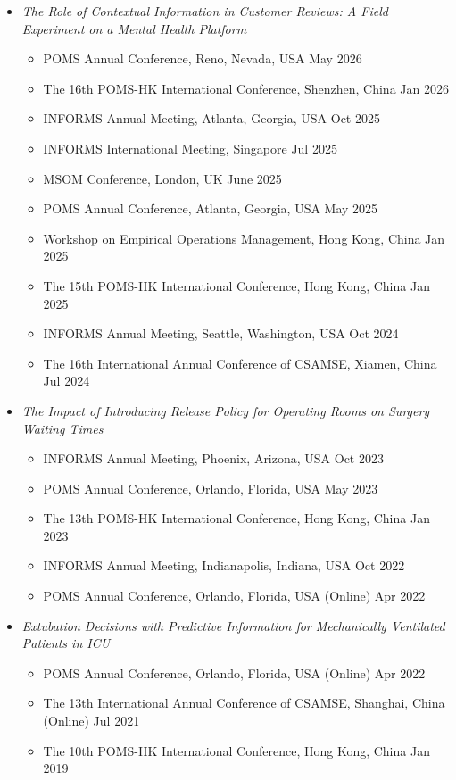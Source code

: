 \documentclass[12pt, a4paper]{article}
\begin{document}
{\begin{itemize}
	\item[] {\it The Role of Contextual Information in Customer Reviews: A Field Experiment on a Mental Health Platform}
	\begin{itemize}
		\item POMS Annual Conference, Reno, Nevada, USA \hfill May 2026
		\item The 16th POMS-HK International Conference, Shenzhen, China \hfill Jan 2026
		\item INFORMS Annual Meeting, Atlanta, Georgia, USA \hfill Oct 2025
		\item INFORMS International Meeting, Singapore \hfill Jul 2025
		\item MSOM Conference, London, UK \hfill June 2025
		\item POMS Annual Conference, Atlanta, Georgia, USA \hfill May 2025
		\item Workshop on Empirical Operations Management, Hong Kong, China \hfill Jan 2025
		\item The 15th POMS-HK International Conference, Hong Kong, China \hfill Jan 2025
		\item INFORMS Annual Meeting, Seattle, Washington, USA \hfill Oct 2024
		\item The 16th International Annual Conference of CSAMSE, Xiamen, China \hfill Jul 2024
	\end{itemize}

	\item[] {\it The Impact of Introducing Release Policy for Operating Rooms on Surgery Waiting Times}
	\begin{itemize}
		\item INFORMS Annual Meeting, Phoenix, Arizona, USA \hfill Oct 2023
		\item POMS Annual Conference, Orlando, Florida, USA \hfill May 2023
		\item The 13th POMS-HK International Conference, Hong Kong, China \hfill Jan 2023
		\item INFORMS Annual Meeting, Indianapolis, Indiana, USA \hfill Oct 2022
		\item POMS Annual Conference, Orlando, Florida, USA (Online) \hfill Apr 2022
	\end{itemize}

	\item[] {\it Extubation Decisions with Predictive Information for Mechanically Ventilated Patients in ICU}
	\begin{itemize}
		\item POMS Annual Conference, Orlando, Florida, USA (Online) \hfill Apr 2022
		\item The 13th International Annual Conference of CSAMSE, Shanghai, China (Online) \hfill Jul 2021
		\item The 10th POMS-HK International Conference, Hong Kong, China \hfill Jan 2019
	\end{itemize}


\end{itemize}}
\end{document}
